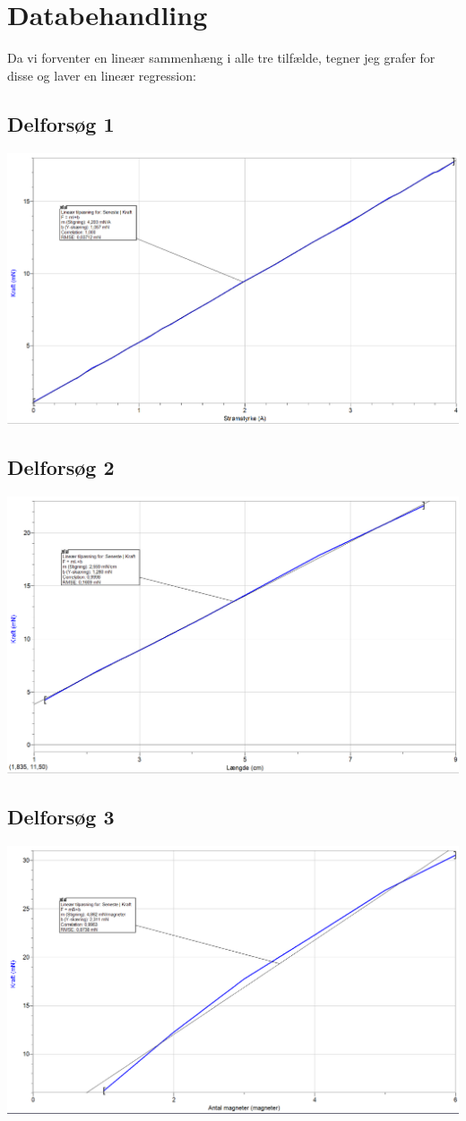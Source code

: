 \documentclass[10pt,a4paper]{article}
\theoremstyle{break}
\theoremstyle{nonumberplain}
\begin{document}
\section{Databehandling}
Da vi forventer en lineær sammenhæng i alle tre tilfælde, tegner jeg grafer for disse og laver en lineær regression:
\subsection{Delforsøg 1}
\begin{center}
\includegraphics[scale=0.5]{graf1}
\end{center}

\subsection{Delforsøg 2}
\begin{center}
\includegraphics[scale=0.5]{graf2}
\end{center}

\subsection{Delforsøg 3}
\begin{center}
\includegraphics[scale=0.5]{graf3}
\end{center}
\end{document}
